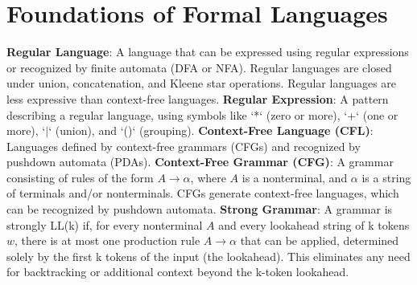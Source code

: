 \section{Foundations of Formal Languages}
\textbf{Regular Language}: A language that can be expressed using regular expressions or recognized by finite automata (DFA or NFA). Regular languages are closed under union, concatenation, and Kleene star operations.  Regular languages are less expressive than context-free languages.
\textbf{Regular Expression}: A pattern describing a regular language, using symbols like `*` (zero or more), `+` (one or more), `$\vert$` (union), and `()` (grouping).
\textbf{Context-Free Language (CFL)}: Languages defined by context-free grammars (CFGs) and recognized by pushdown automata (PDAs).
\textbf{Context-Free Grammar (CFG)}: A grammar consisting of rules of the form $A \rightarrow \alpha $, where $A$ is a nonterminal, and $\alpha $ is a string of terminals and/or nonterminals. CFGs generate context-free languages, which can be recognized by pushdown automata.
\textbf{Strong Grammar}: A grammar is strongly LL(k) if, for every nonterminal $ A $ and every lookahead string of k tokens $ w $, there is at most one production rule $ A \to \alpha $ that can be applied, determined solely by the first k tokens of the input (the lookahead). This eliminates any need for backtracking or additional context beyond the k-token lookahead.

